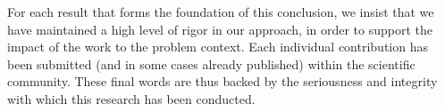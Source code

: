 For each result that forms the foundation of this conclusion, we insist that we have maintained a high level of rigor in our approach, in order to support the impact of the work to the problem context. Each individual contribution has been submitted (and in some cases already published) within the scientific community. These final words are thus backed by the seriousness and integrity with which this research has been conducted.










\newpage\thispagestyle{plain}

